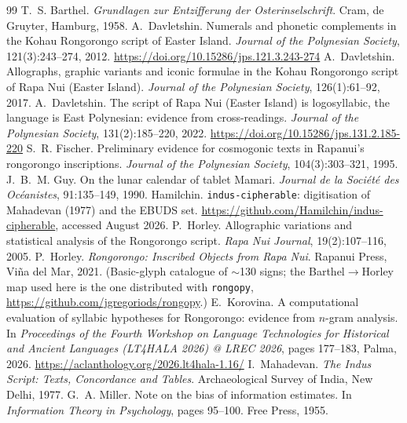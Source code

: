 \documentclass[11pt,a4paper]{article}
\begin{document}
\begin{thebibliography}{99}
 T.~S. Barthel. \emph{Grundlagen zur Entzifferung der Osterinselschrift}. Cram, de Gruyter, Hamburg, 1958.
 A.~Davletshin. Numerals and phonetic complements in the Kohau Rongorongo script of Easter Island. \emph{Journal of the Polynesian Society}, 121(3):243--274, 2012. \url{https://doi.org/10.15286/jps.121.3.243-274}
 A.~Davletshin. Allographs, graphic variants and iconic formulae in the Kohau Rongorongo script of Rapa Nui (Easter Island). \emph{Journal of the Polynesian Society}, 126(1):61--92, 2017.
 A.~Davletshin. The script of Rapa Nui (Easter Island) is logosyllabic, the language is East Polynesian: evidence from cross-readings. \emph{Journal of the Polynesian Society}, 131(2):185--220, 2022. \url{https://doi.org/10.15286/jps.131.2.185-220}
 S.~R. Fischer. Preliminary evidence for cosmogonic texts in Rapanui's rongorongo inscriptions. \emph{Journal of the Polynesian Society}, 104(3):303--321, 1995.
 J.~B.~M. Guy. On the lunar calendar of tablet Mamari. \emph{Journal de la Soci\'et\'e des Oc\'eanistes}, 91:135--149, 1990.
 Hamilchin. \texttt{indus-cipherable}: digitisation of Mahadevan (1977) and the EBUDS set. \url{https://github.com/Hamilchin/indus-cipherable}, accessed August 2026.
 P.~Horley. Allographic variations and statistical analysis of the Rongorongo script. \emph{Rapa Nui Journal}, 19(2):107--116, 2005.
 P.~Horley. \emph{Rongorongo: Inscribed Objects from Rapa Nui}. Rapanui Press, Vi\~na del Mar, 2021. (Basic-glyph catalogue of $\sim$130 signs; the Barthel$\to$Horley map used here is the one distributed with \texttt{rongopy}, \url{https://github.com/jgregoriods/rongopy}.)
 E.~Korovina. A computational evaluation of syllabic hypotheses for Rongorongo: evidence from $n$-gram analysis. In \emph{Proceedings of the Fourth Workshop on Language Technologies for Historical and Ancient Languages (LT4HALA 2026) @ LREC 2026}, pages 177--183, Palma, 2026. \url{https://aclanthology.org/2026.lt4hala-1.16/}
 I.~Mahadevan. \emph{The Indus Script: Texts, Concordance and Tables}. Archaeological Survey of India, New Delhi, 1977.
 G.~A. Miller. Note on the bias of information estimates. In \emph{Information Theory in Psychology}, pages 95--100. Free Press, 1955.

\end{thebibliography}
\end{document}

